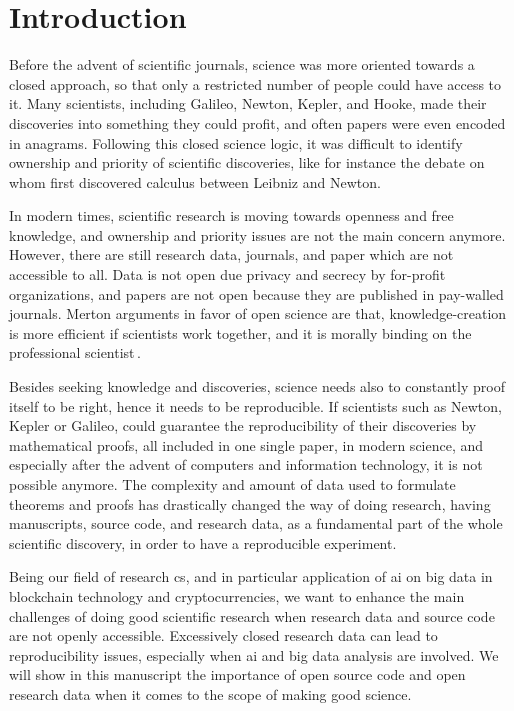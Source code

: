 \section{Introduction}
Before the advent of scientific journals,
science was more oriented towards a closed approach, so that only a restricted number
of people could have access to it.
Many scientists, including Galileo, Newton, Kepler, and Hooke, made their discoveries into
something they could profit, and often papers were even encoded in anagrams.
Following this closed science logic, it was difficult
to identify ownership and priority of scientific discoveries, like for instance the
debate on whom first discovered calculus between Leibniz and Newton.

In modern times, scientific research is moving towards openness and free knowledge,
and ownership and priority issues are not the main concern anymore. However,
there are still research data, journals, and paper which are not accessible to all.
Data is not open due privacy and secrecy by for-profit organizations, and
papers are not open because they are published in pay-walled journals.
Merton arguments in favor of open science are
that, knowledge-creation is more efficient if scientists work together, and
it is morally binding on the professional scientist\,\cite{merton1942science}.

Besides seeking knowledge and discoveries, science needs also to constantly proof itself
to be right, hence it needs to be reproducible. If scientists such as Newton, Kepler or Galileo,
could guarantee the reproducibility of their discoveries by mathematical proofs, all included in one single paper,
in modern science, and especially after the advent of computers and information technology,
it is not possible anymore. The complexity and amount of data used
to formulate theorems and proofs has drastically changed the way of doing research,
having manuscripts, source code, and research data, as a fundamental part of the whole scientific discovery,
in order to have a reproducible experiment.

Being our field of research \ac{cs}, and in particular
application of \ac{ai} on big data in blockchain technology and cryptocurrencies,
we want to enhance the main challenges of doing good scientific
research when research data and source code are not openly accessible.
Excessively closed research data can lead to reproducibility issues,
especially when \ac{ai} and big data analysis are involved.
%
We will show in this manuscript the importance of open source code
and open research data when it comes to the scope of making good science.

